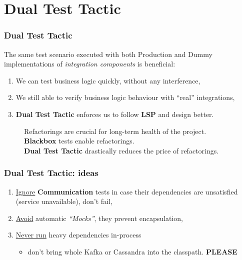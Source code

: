 \documentclass[usenames,dvipsnames,aspectratio=169]{beamer}
\begin{document}
\section{Dual Test Tactic}
\begin{frame}
  \frametitle{Dual Test Tactic}
  The same test scenario executed with both Production and Dummy implementations of \textit{integration components} is beneficial:

  \begin{enumerate}
  \item We can test business logic quickly, without any interference,
  \item We still able to verify business logic behaviour with ``real'' integrations,
  \item \textbf{Dual Test Tactic} enforces us to follow \textbf{LSP} and design better.
  \end{enumerate}

  \begin{figure}
  Refactorings are crucial for long-term health of the project. \\
  \textbf{Blackbox} tests enable refactorings. \\
  \textbf{Dual Test Tactic} drastically reduces the price of refactorings.
  \end{figure}
\end{frame}

\begin{frame}
  \frametitle{Dual Test Tactic: ideas}

  \begin{enumerate}
    \item \underline{Ignore} \textbf{Communication} tests in case their dependencies are unsatisfied (service unavailable), don't fail,
    \item \underline{Avoid} automatic \textit{``Mocks''}, they prevent encapsulation,
    \item \underline{Never run} heavy dependencies in-process
    \begin{itemize}
      \item don't bring whole Kafka or Cassandra into the classpath. \textbf{PLEASE}
    \end{itemize}
  \end{enumerate}
\end{frame}
\end{document}
